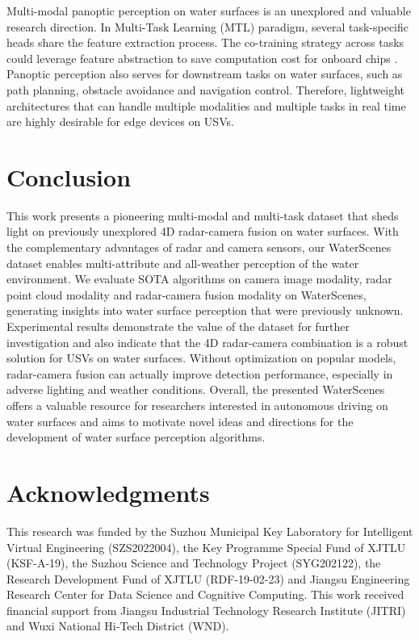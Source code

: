 \documentclass[lettersize,journal]{IEEEtran}
\begin{document}
Multi-modal panoptic perception on water surfaces is an unexplored and valuable research direction. In Multi-Task Learning (MTL) paradigm, several task-specific heads share the feature extraction process. The co-training strategy across tasks could leverage feature abstraction to save computation cost for onboard chips \cite{liang2022effective,hu2023planning}. Panoptic perception also serves for downstream tasks on water surfaces, such as path planning, obstacle avoidance and navigation control. Therefore, lightweight architectures that can handle multiple modalities and multiple tasks in real time are highly desirable for edge devices on USVs.

\vspace{2.5mm}\section{Conclusion}
\label{sec:Conclusion}

This work presents a pioneering multi-modal and multi-task dataset that sheds light on previously unexplored 4D radar-camera fusion on water surfaces. With the complementary advantages of radar and camera sensors, our WaterScenes dataset enables multi-attribute and all-weather perception of the water environment.
We evaluate SOTA algorithms on camera image modality, radar point cloud  modality and radar-camera fusion modality on WaterScenes, generating insights into water surface perception that were previously unknown. 
Experimental results demonstrate the value of the dataset for further investigation and also indicate that the 4D radar-camera combination is a robust solution for USVs on water surfaces. 
Without optimization on popular models, radar-camera fusion can actually improve detection performance, especially in adverse lighting and weather conditions.
Overall, the presented WaterScenes offers a valuable resource for researchers interested in autonomous driving on water surfaces and aims to motivate novel ideas and directions for the development of water surface perception algorithms. 


\section*{Acknowledgments}

This research was funded by the Suzhou Municipal Key Laboratory for Intelligent Virtual Engineering (SZS2022004), the Key Programme Special Fund of XJTLU (KSF-A-19), the Suzhou Science and Technology Project (SYG202122), the Research Development Fund of XJTLU (RDF-19-02-23) and Jiangsu Engineering Research Center for Data Science and Cognitive Computing. 
This work received financial support from Jiangsu Industrial Technology Research Institute (JITRI) and Wuxi National Hi-Tech District (WND).
\end{document}
